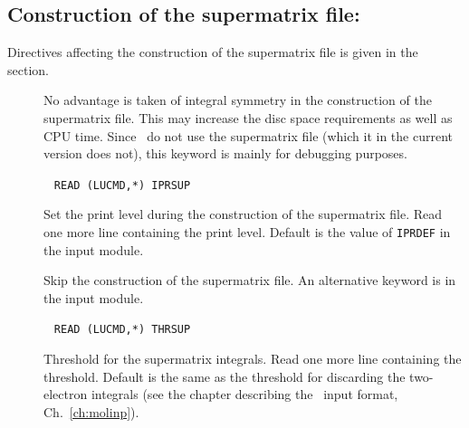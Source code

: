 
\subsection{Construction of the supermatrix file:
}\label{sec:supint}

Directives affecting the construction of the
supermatrix file is given
in the  section.

\begin{description}
\item[] No advantage is taken of integral symmetry in the
construction of the supermatrix file. This may increase the disc space
requirements as well as  CPU time. Since \aba\ do not use the
supermatrix file (which it in the current version does not), this
keyword is mainly for debugging purposes.

\item[]\verb| |\newline
\verb|READ (LUCMD,*) IPRSUP|

Set the print level during the construction of the supermatrix file.
Read one more line containing the print level. Default is the
value of \verb|IPRDEF| in the  input module.

\item[] Skip the construction of the supermatrix file.
An alternative keyword is  in the  input
module.

\item[]\verb| |\newline
\verb|READ (LUCMD,*) THRSUP|

Threshold for the supermatrix integrals. Read one more line containing
the threshold. Default is the same as the threshold for
discarding the two-electron integrals (see the chapter describing the
\mol\ input format, Ch.~\ref{ch:molinp}).
\end{description}
